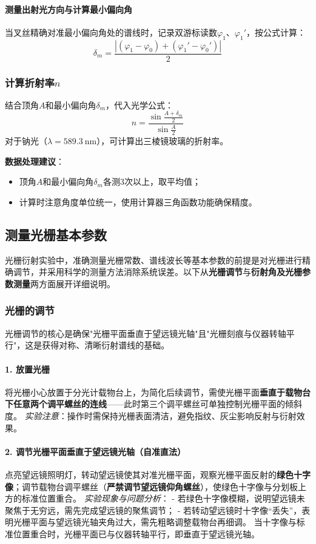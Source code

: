\documentclass[11pt]{article}
\begin{document}
\paragraph{测量出射光方向与计算最小偏向角}
当叉丝精确对准最小偏向角处的谱线时，记录双游标读数\(\varphi_1\)、\(\varphi_1'\)，按公式计算：
\[
\delta_m = \frac{|\left(\varphi_1 - \varphi_0\right) + \left(\varphi_1' - \varphi_0'\right)|}{2}
\]

\subsubsection{计算折射率\(n\)}
结合顶角\(A\)和最小偏向角\(\delta_m\)，代入光学公式：
\[
n = \frac{\sin\frac{A + \delta_m}{2}}{\sin\frac{A}{2}}
\]
对于钠光（\(\lambda = 589.3\ \text{nm}\)），可计算出三棱镜玻璃的折射率。

\textbf{数据处理建议}：
\begin{itemize}
    \item 顶角\(A\)和最小偏向角\(\delta_m\)各测3次以上，取平均值；
    \item 计算时注意角度单位统一，使用计算器三角函数功能确保精度。
\end{itemize}

\subsection{测量光栅基本参数}
光栅衍射实验中，准确测量光栅常数、谱线波长等基本参数的前提是对光栅进行精确调节，并采用科学的测量方法消除系统误差。以下从\textbf{光栅调节}与\textbf{衍射角及光栅参数测量}两方面展开详细说明。

\subsubsection{光栅的调节}
光栅调节的核心是确保"光栅平面垂直于望远镜光轴"且"光栅刻痕与仪器转轴平行"，这是获得对称、清晰衍射谱线的基础。

\paragraph{1. 放置光栅}
将光栅小心放置于分光计载物台上，为简化后续调节，需使光栅平面\textbf{垂直于载物台下任意两个调平螺丝的连线}——此时第三个调平螺丝可单独控制光栅平面的倾斜度。
\textit{实验注意}：操作时需保持光栅表面清洁，避免指纹、灰尘影响反射与衍射效果。

\paragraph{2. 调节光栅平面垂直于望远镜光轴（自准直法）}
点亮望远镜照明灯，转动望远镜使其对准光栅平面，观察光栅平面反射的\textbf{绿色十字像}；调节载物台调平螺丝（\textbf{严禁调节望远镜仰角螺丝}），使绿色十字像与分划板上方的标准位置重合。
\textit{实验现象与问题分析}：
- 若绿色十字像模糊，说明望远镜未聚焦于无穷远，需先完成望远镜的聚焦调节；
- 若转动望远镜时十字像“丢失”，表明光栅平面与望远镜光轴夹角过大，需先粗略调整载物台再细调。
当十字像与标准位置重合时，光栅平面已与仪器转轴平行，即垂直于望远镜光轴。
\end{document}
